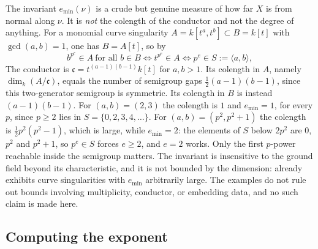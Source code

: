 \begin{remark}
\label{rem:ch43-emin-meaning}
The invariant $e_{\min}(\nu)$ is a crude but genuine measure of how far
$X$ is from normal along $\nu$.  It is \emph{not} the colength of the
conductor and not the degree of anything.  For a monomial curve singularity
$A=k[t^a,t^b]\subset B=k[t]$ with $\gcd(a,b)=1$, one has
$B=A[t]$, so by 
\[
 b^{p^e}\in A\ \text{for all }b\in B
 \iff t^{p^e}\in A
 \iff p^e\in S:=\langle a,b\rangle,
\]
The conductor is $\mathfrak c=t^{(a-1)(b-1)}k[t]$ for $a,b>1$.
Its colength in $A$, namely $\dim_k(A/\mathfrak c)$, equals the
number of semigroup gaps $\tfrac12(a-1)(b-1)$, since this two-generator
semigroup is symmetric.  Its colength in $B$ is instead
$(a-1)(b-1)$.  For $(a,b)=(2,3)$ the colength is $1$
and $e_{\min}=1$, for every $p$, since $p\ge2$ lies in
$S=\{0,2,3,4,\ldots\}$.  For $(a,b)=(p^2,p^2+1)$ the colength is
$\tfrac12p^2(p^2-1)$, which is large, while $e_{\min}=2$: the elements
of $S$ below $2p^2$ are $0$, $p^2$ and $p^2+1$, so $p^e\in S$
forces $e\ge2$, and $e=2$ works.  Only the first $p$-power reachable
inside the semigroup matters.  The invariant is insensitive to the ground
field beyond its characteristic, and it is not bounded by the dimension:
 already exhibits curve singularities
with $e_{\min}$ arbitrarily large.  The examples do not rule out bounds
involving multiplicity, conductor, or embedding data, and no such claim is
made here.
\end{remark}

\subsection{Computing the exponent}
\label{sec:ch43-frobenius-examples}

